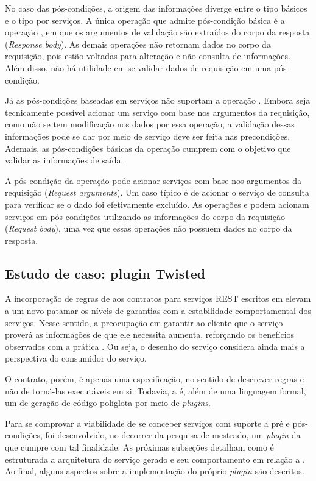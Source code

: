 No caso das pós-condições, a origem das informações diverge entre o tipo
básicos e o tipo por serviços. A única operação que admite pós-condição básica é
a operação , em que os argumentos de validação são extraídos do
corpo da resposta (\textit{Response body}). As demais operações não retornam dados
no corpo da requisição, pois estão voltadas para alteração e não consulta de
informações. Além disso, não há utilidade em se validar dados de requisição
em uma pós-condição.

Já as pós-condições baseadas em serviços não suportam a operação .
Embora seja tecnicamente possível acionar um serviço com base nos argumentos da
requisição, como não se tem modificação nos dados por essa operação, a
validação dessas informações pode se dar por meio de serviço deve ser feita nas
precondições. Ademais, as pós-condições básicas da operação  cumprem
com o objetivo que validar as informações de saída.

A pós-condição da operação  pode acionar serviços com base nos
argumentos da requisição (\textit{Request arguments}). Um caso típico é de
acionar o serviço de consulta para verificar se o dado foi efetivamente
excluído. As operações  e  podem acionam serviços em
pós-condições utilizando as informações do corpo da requisição (\textit{Request
body}), uma vez que essas operações não possuem dados no corpo da resposta. 
 
\subsection{Estudo de caso: plugin Twisted}
\label{pluginTwisted}

A incorporação de regras de \designbycontract{} aos contratos para
serviços REST escritos em \neoidl{} elevam a um novo patamar os níveis de
garantias com a estabilidade comportamental dos serviços. Nesse sentido, a
preocupação em garantir ao cliente que o serviço proverá as informações de que
ele necessita aumenta, reforçando os benefícios observados com a prática
\CtFirst{}. Ou seja, o desenho do serviço considera ainda mais a perspectiva do
consumidor do serviço.

O contrato, porém, é apenas uma especificação, no
sentido de descrever regras e não de torná-las executáveis em si. Todavia, a
\neoidl{} é, além de uma linguagem formal, um \framework{} de geração de
código poliglota por meio de \textit{plugins}.

Para se comprovar a viabilidade de se conceber serviços com suporte a pré e
pós-condições, foi desenvolvido, no decorrer da pesquisa de mestrado, um
\textit{plugin} da \neoidl{} que cumpre com tal finalidade. As próximas
subseções detalham como é estruturada a arquitetura do serviço gerado e seu comportamento em relação a
\designbycontract{}. Ao final, alguns aspectos sobre a implementação do
próprio \textit{plugin} são descritos.

